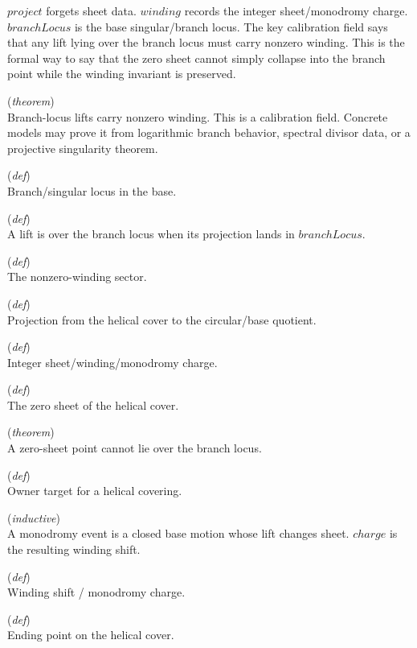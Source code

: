 \documentclass[11pt,a4paper]{article}
\begin{document}
\begin{description}
$project$ forgets sheet data. 
$winding$ records the integer sheet/monodromy charge. 
$branchLocus$ is the base singular/branch locus.  The key calibration field says 
that any lift lying over the branch locus must carry nonzero winding.  This is 
the formal way to say that the zero sheet cannot simply collapse into the 
branch point while the winding invariant is preserved.
  \item[\texttt{branch\_requires\_nonzero\_winding}] (\textit{theorem}) \\ Branch-locus lifts carry nonzero winding. 
This is a calibration field.  Concrete models may prove it from logarithmic 
branch behavior, spectral divisor data, or a projective singularity theorem.
  \item[\texttt{branchLocus}] (\textit{def}) \\ Branch/singular locus in the base.
  \item[\texttt{LiesOverBranch}] (\textit{def}) \\ A lift is over the branch locus when its projection lands in $branchLocus$.
  \item[\texttt{nonzeroWindingSector}] (\textit{def}) \\ The nonzero-winding sector.
  \item[\texttt{project}] (\textit{def}) \\ Projection from the helical cover to the circular/base quotient.
  \item[\texttt{winding}] (\textit{def}) \\ Integer sheet/winding/monodromy charge.
  \item[\texttt{zeroSheet}] (\textit{def}) \\ The zero sheet of the helical cover.
  \item[\texttt{zeroSheet\_not\_over\_branch}] (\textit{theorem}) \\ A zero-sheet point cannot lie over the branch locus.
  \item[\texttt{HelicalCoveringOwnerTarget}] (\textit{def}) \\ Owner target for a helical covering.
  \item[\texttt{MonodromyEvent}] (\textit{inductive}) \\ A monodromy event is a closed base motion whose lift changes sheet. 
$charge$ is the resulting winding shift.
  \item[\texttt{charge}] (\textit{def}) \\ Winding shift / monodromy charge.
  \item[\texttt{finish}] (\textit{def}) \\ Ending point on the helical cover.

\end{description}
\end{document}
